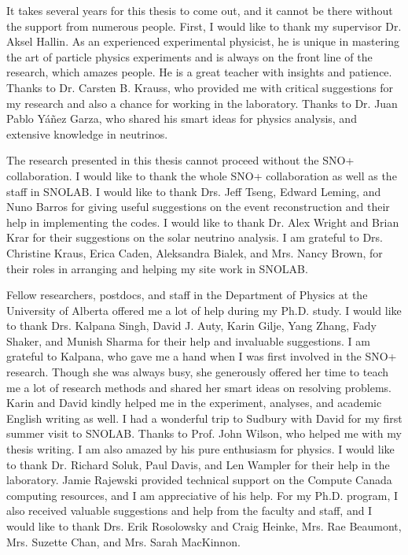 It takes several years for this thesis to come out, and it cannot be there without the support from numerous people. First, I would like to thank my supervisor Dr. Aksel Hallin. As an experienced experimental physicist, he is unique in mastering the art of particle physics experiments and is always on the front line of the research, which amazes people. He is a great teacher with insights and patience. Thanks to Dr. Carsten B. Krauss, who provided me with critical suggestions for my research and also a chance for working in the laboratory. Thanks to Dr. Juan Pablo Y\'{a}\~{n}ez Garza, who shared his smart ideas for physics analysis, and extensive knowledge in neutrinos.

The research presented in this thesis cannot proceed without the SNO+ collaboration. I would like to thank the whole SNO+ collaboration as well as the staff in SNOLAB. I would like to thank Drs. Jeff Tseng, Edward Leming, and Nuno Barros for giving useful suggestions on the event reconstruction and their help in implementing the codes. I would like to thank Dr. Alex Wright and Brian Krar for their suggestions on the solar neutrino analysis. I am grateful to Drs. Christine Kraus, Erica Caden, Aleksandra Bialek, and Mrs. Nancy Brown, for their roles in arranging and helping my site work in SNOLAB.

Fellow researchers, postdocs, and staff in the Department of Physics at the University of Alberta offered me a lot of help during my Ph.D. study. I would like to thank Drs. Kalpana Singh, David J. Auty, Karin Gilje, Yang Zhang, Fady Shaker, and Munish Sharma for their help and invaluable suggestions. I am grateful to Kalpana, who gave me a hand when I was first involved in the SNO+ research. Though she was always busy, she generously offered her time to teach me a lot of research methods and shared her smart ideas on resolving problems. Karin and David kindly helped me in the experiment, analyses, and academic English writing as well. I had a wonderful trip to Sudbury with David for my first summer visit to SNOLAB. Thanks to Prof. John Wilson, who helped me with my thesis writing. I am also amazed by his pure enthusiasm for physics. I would like to thank Dr. Richard Soluk, Paul Davis, and Len Wampler for their help in the laboratory. Jamie Rajewski provided technical support on the Compute Canada computing resources, and I am appreciative of his help. For my Ph.D. program, I also received valuable suggestions and help from the faculty and staff, and I would like to thank Drs. Erik Rosolowsky and Craig Heinke, Mrs. Rae Beaumont, Mrs. Suzette Chan, and Mrs. Sarah MacKinnon.


